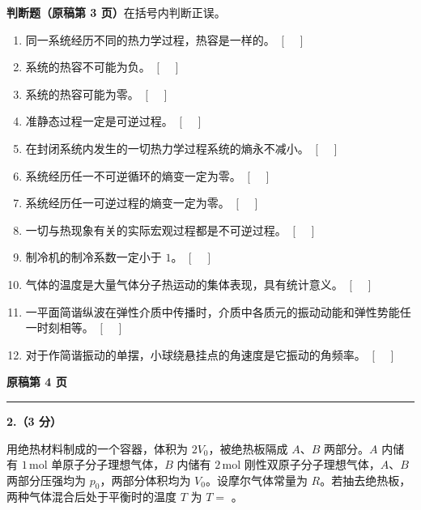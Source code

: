 \documentclass[zihao=4,a4paper,UTF8]{ctexart}
\newcommand{\qitem}[1]{
    \par
    \needspace{4\baselineskip}
    \smallskip
    \noindent
    \textbf{#1}\hspace{0.5em}\ignorespaces
}
\newcommand{\fillblank}[1][2.2cm]{%
    \underline{\makebox[#1]{}}%
}
\newcommand{\tfbox}{%
    \unskip\hspace{0.3em}\ensuremath{[\quad]}%
}
\newcommand{\sourcepage}[1]{
    \par
    \medskip
    \noindent
    {\normalsize\bfseries 原稿第 #1 页}
    \par
    \vspace{-0.2em}
    \hrule
    \smallskip
}
\begin{document}
\medskip
{}
\noindent
\textbf{判断题（原稿第 3 页）}\quad 在括号内判断正误。
\begin{enumerate}[label=\arabic*.]
    \item 同一系统经历不同的热力学过程，热容是一样的。\tfbox
    \item 系统的热容不可能为负。\tfbox
    \item 系统的热容可能为零。\tfbox
    \item 准静态过程一定是可逆过程。\tfbox
    \item 在封闭系统内发生的一切热力学过程系统的熵永不减小。\tfbox
    \item 系统经历任一不可逆循环的熵变一定为零。\tfbox
    \item 系统经历任一可逆过程的熵变一定为零。\tfbox
    \item 一切与热现象有关的实际宏观过程都是不可逆过程。\tfbox
    \item 制冷机的制冷系数一定小于 $1$。\tfbox
    \item 气体的温度是大量气体分子热运动的集体表现，具有统计意义。\tfbox
    \item 一平面简谐纵波在弹性介质中传播时，介质中各质元的振动动能和弹性势能任一时刻相等。\tfbox
    \item 对于作简谐振动的单摆，小球绕悬挂点的角速度是它振动的角频率。\tfbox
\end{enumerate}


\sourcepage{4}

\qitem{2.（3 分）}
用绝热材料制成的一个容器，体积为 $2V_0$，被绝热板隔成 $A$、$B$ 两部分。$A$ 内储有 $1\,\mathrm{mol}$ 单原子分子理想气体，$B$ 内储有 $2\,\mathrm{mol}$ 刚性双原子分子理想气体，$A$、$B$ 两部分压强均为 $p_0$，两部分体积均为 $V_0$。设摩尔气体常量为 $R$。若抽去绝热板，两种气体混合后处于平衡时的温度 $T$ 为 $T=$ \fillblank[3.0cm]。
\end{document}
